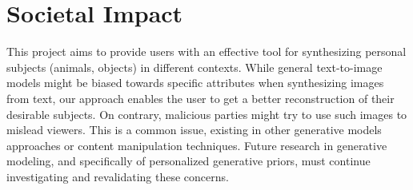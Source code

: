 \section*{Societal Impact}
This project aims to provide users with an effective tool for synthesizing personal subjects (animals, objects) in different contexts. While general text-to-image models might be biased towards specific attributes when synthesizing images from text, our approach enables the user to get a better reconstruction of their desirable subjects. On contrary, malicious parties might try to use such images to mislead viewers. This is a common issue, existing in other generative models approaches or content manipulation techniques. Future research in generative modeling, and specifically of personalized generative priors, must continue investigating and revalidating these concerns.